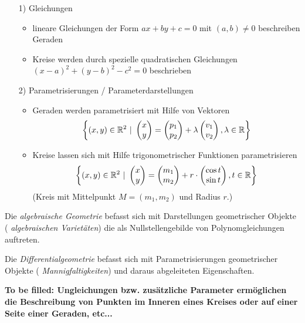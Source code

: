 \begin{enumerate}
\item[1)] Gleichungen

\begin{itemize}
\item lineare Gleichungen der Form $a x + b y + c = 0$ mit $(a,b) \not = 0$ beschreiben Geraden
\item Kreise werden durch spezielle quadratischen Gleichungen $(x-a)^2 + (y-b)^2 - c^2 = 0$
beschrieben


\end{itemize}

\item[2)] Parametrisierungen / Parameterdarstellungen

\begin{itemize}
\item Geraden werden parametrisiert mit Hilfe von Vektoren
$$
	\left\{
		(x,y) \in \mathbb R^2 \ | \ \begin{pmatrix}{x}\\{y}\end{pmatrix} = \begin{pmatrix}{p_1}\\{p_2}\end{pmatrix} + \lambda \begin{pmatrix}{v_1}\\{v_2}\end{pmatrix}, \lambda \in \mathbb R
	\right\}
$$

\item Kreise lassen sich mit Hilfe trigonometrischer Funktionen parametrisieren
$$
	\left\{
		(x,y) \in \mathbb R^2 \ | \ \begin{pmatrix}{x}\\{y}\end{pmatrix} = \begin{pmatrix}{m_1}\\{m_2}\end{pmatrix} + r \cdot \begin{pmatrix}{\cos t}\\{\sin t}\end{pmatrix}, t \in \mathbb R
	\right\}
$$
\hfill (Kreis mit Mittelpunkt $M = (m_1, m_2)$ und Radius $r$.)
\end{itemize}

\end{enumerate}


Die {\em algebraische Geometrie} befasst sich mit Darstellungen geometrischer Objekte ({\em
algebraischen Varietäten}) die als Nullstellengebilde von Polynomgleichungen auftreten.

Die {\em Differentialgeometrie} befasst sich mit Parametrisierungen geometrischer Objekte ({\em
Mannigfaltigkeiten}) und daraus abgeleiteten Eigenschaften.%

\medskip

{\bf To be filled: Ungleichungen bzw. zusätzliche Parameter ermöglichen die Beschreibung von Punkten
im Inneren eines Kreises oder auf einer Seite einer Geraden, etc...}

